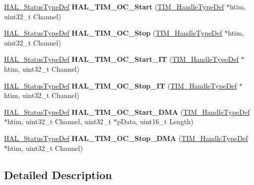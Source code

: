 \begin{DoxyCompactItemize}
\mbox{\hyperlink{stm32f4xx__hal__def_8h_a63c0679d1cb8b8c684fbb0632743478f}{H\+A\+L\+\_\+\+Status\+Type\+Def}} {\bfseries H\+A\+L\+\_\+\+T\+I\+M\+\_\+\+O\+C\+\_\+\+Start} (\mbox{\hyperlink{struct_t_i_m___handle_type_def}{T\+I\+M\+\_\+\+Handle\+Type\+Def}} $\ast$htim, uint32\+\_\+t Channel)
\item 
\mbox{\label{group___t_i_m___exported___functions___group2_ga9cb1f62afb99aea0db8cc28b378b68ad}} 
\mbox{\hyperlink{stm32f4xx__hal__def_8h_a63c0679d1cb8b8c684fbb0632743478f}{H\+A\+L\+\_\+\+Status\+Type\+Def}} {\bfseries H\+A\+L\+\_\+\+T\+I\+M\+\_\+\+O\+C\+\_\+\+Stop} (\mbox{\hyperlink{struct_t_i_m___handle_type_def}{T\+I\+M\+\_\+\+Handle\+Type\+Def}} $\ast$htim, uint32\+\_\+t Channel)
\item 
\mbox{\label{group___t_i_m___exported___functions___group2_gad3116f3b344392f7b947ff1218ba9ed8}} 
\mbox{\hyperlink{stm32f4xx__hal__def_8h_a63c0679d1cb8b8c684fbb0632743478f}{H\+A\+L\+\_\+\+Status\+Type\+Def}} {\bfseries H\+A\+L\+\_\+\+T\+I\+M\+\_\+\+O\+C\+\_\+\+Start\+\_\+\+IT} (\mbox{\hyperlink{struct_t_i_m___handle_type_def}{T\+I\+M\+\_\+\+Handle\+Type\+Def}} $\ast$htim, uint32\+\_\+t Channel)
\item 
\mbox{\label{group___t_i_m___exported___functions___group2_gacc324ef35c0b207a8331c657d86fc1bd}} 
\mbox{\hyperlink{stm32f4xx__hal__def_8h_a63c0679d1cb8b8c684fbb0632743478f}{H\+A\+L\+\_\+\+Status\+Type\+Def}} {\bfseries H\+A\+L\+\_\+\+T\+I\+M\+\_\+\+O\+C\+\_\+\+Stop\+\_\+\+IT} (\mbox{\hyperlink{struct_t_i_m___handle_type_def}{T\+I\+M\+\_\+\+Handle\+Type\+Def}} $\ast$htim, uint32\+\_\+t Channel)
\item 
\mbox{\label{group___t_i_m___exported___functions___group2_ga6f961349029a84317b7734abbfb9a02c}} 
\mbox{\hyperlink{stm32f4xx__hal__def_8h_a63c0679d1cb8b8c684fbb0632743478f}{H\+A\+L\+\_\+\+Status\+Type\+Def}} {\bfseries H\+A\+L\+\_\+\+T\+I\+M\+\_\+\+O\+C\+\_\+\+Start\+\_\+\+D\+MA} (\mbox{\hyperlink{struct_t_i_m___handle_type_def}{T\+I\+M\+\_\+\+Handle\+Type\+Def}} $\ast$htim, uint32\+\_\+t Channel, uint32\+\_\+t $\ast$p\+Data, uint16\+\_\+t Length)
\item 
\mbox{\label{group___t_i_m___exported___functions___group2_ga27f1f66d2d38ec428580a5feb3628c48}} 
\mbox{\hyperlink{stm32f4xx__hal__def_8h_a63c0679d1cb8b8c684fbb0632743478f}{H\+A\+L\+\_\+\+Status\+Type\+Def}} {\bfseries H\+A\+L\+\_\+\+T\+I\+M\+\_\+\+O\+C\+\_\+\+Stop\+\_\+\+D\+MA} (\mbox{\hyperlink{struct_t_i_m___handle_type_def}{T\+I\+M\+\_\+\+Handle\+Type\+Def}} $\ast$htim, uint32\+\_\+t Channel)
\end{DoxyCompactItemize}


\subsection{Detailed Description}
